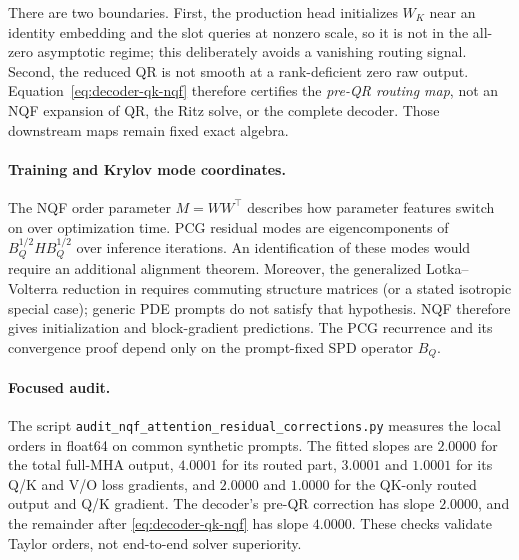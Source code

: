 \documentclass[11pt]{article}
\begin{document}
There are two boundaries.  First, the production head initializes $W_K$ near
an identity embedding and the slot queries at nonzero scale, so it is not in
the all-zero asymptotic regime; this deliberately avoids a vanishing routing
signal.  Second, the reduced QR is not smooth at a rank-deficient zero raw
output.  Equation~\eqref{eq:decoder-qk-nqf} therefore certifies the
\emph{pre-QR routing map}, not an NQF expansion of QR, the Ritz solve, or the
complete decoder.  Those downstream maps remain fixed exact algebra.

\paragraph{Training and Krylov mode coordinates.}
The NQF order parameter $M=WW^\top$ describes how parameter features switch
on over optimization time.  PCG residual modes are eigencomponents of
$B_Q^{1/2}HB_Q^{1/2}$ over inference iterations.  An identification of these
modes would require an additional alignment theorem.  Moreover, the generalized
Lotka--Volterra reduction in \cite{ziyin2026neuralquadraticforms} requires
commuting structure matrices (or a stated isotropic special case); generic
PDE prompts do not satisfy that hypothesis.  NQF therefore gives
initialization and block-gradient predictions.  The PCG recurrence and its
convergence proof depend only on the prompt-fixed SPD operator $B_Q$.

\paragraph{Focused audit.}
The script
\texttt{audit\_nqf\_attention\_residual\_corrections.py} measures the local
orders in float64 on common synthetic prompts.  The fitted slopes are
$2.0000$ for the total full-MHA output, $4.0001$ for its routed part,
$3.0001$ and $1.0001$ for its Q/K and V/O loss gradients, and $2.0000$ and
$1.0000$ for the QK-only routed output and Q/K gradient.  The decoder's
pre-QR correction has slope $2.0000$, and the remainder after
\eqref{eq:decoder-qk-nqf} has slope $4.0000$.  These checks validate Taylor
orders, not end-to-end solver superiority.
\end{document}
